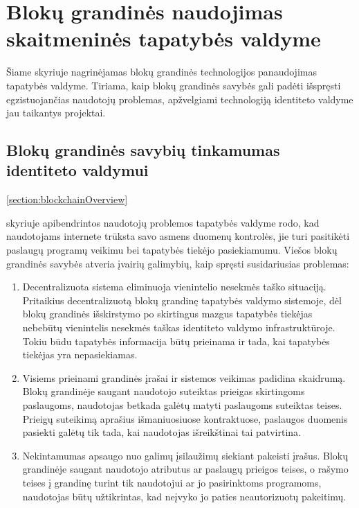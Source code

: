\section{Blokų grandinės naudojimas skaitmeninės tapatybės valdyme} \label{section:BCusageinIDM}

Šiame skyriuje nagrinėjamas blokų grandinės technologijos panaudojimas tapatybės valdyme.
Tiriama, kaip blokų grandinės savybės gali padėti išspręsti egzistuojančias
naudotojų problemas, apžvelgiami technologiją identiteto valdyme jau taikantys projektai.


\subsection{Blokų grandinės savybių tinkamumas identiteto valdymui} \label{blockchain:suitabilityForIDM}

\hypertarget{section:blockchainOverview}{\ref{section:blockchainOverview}} skyriuje apibendrintos naudotojų problemos
tapatybės valdyme rodo, kad naudotojams internete trūksta savo asmens duomenų kontrolės, jie turi pasitikėti paslaugų programų veikimu
bei tapatybės tiekėjo pasiekiamumu. Viešos blokų grandinės savybės atveria įvairių galimybių, kaip spręsti susidariusias problemas:

\begin{enumerate}
    \item Decentralizuota sistema eliminuoja vienintelio nesekmės taško situaciją. Pritaikius decentralizuotą blokų grandinę
    tapatybės valdymo sistemoje, dėl blokų grandinės išskirstymo po skirtingus mazgus 
    tapatybės tiekėjas nebebūtų vienintelis nesekmės taškas identiteto valdymo infrastruktūroje. Tokiu būdu tapatybės informacija būtų prieinama ir tada,
    kai tapatybės tiekėjas yra nepasiekiamas.

    \item Visiems prieinami grandinės įrašai ir sistemos veikimas padidina skaidrumą. Blokų grandinėje saugant naudotojo suteiktas prieigas skirtingoms paslaugoms,
    naudotojas betkada galėtų matyti paslaugoms suteiktas teises. Prieigų suteikimą aprašius išmaniuosiuose kontraktuose, paslaugos duomenis
    pasiekti galėtų tik tada, kai naudotojas išreikštinai tai patvirtina.

    \item Nekintamumas apsaugo nuo galimų įsilaužimų siekiant pakeisti įrašus.
    Blokų grandinėje saugant naudotojo atributus ar paslaugų prieigos teises,
    o rašymo teises į grandinę turint tik naudotojui ar jo pasirinktoms programoms, naudotojas būtų užtikrintas, kad
    neįvyko jo paties neautorizuotų pakeitimų.
\end{enumerate}

